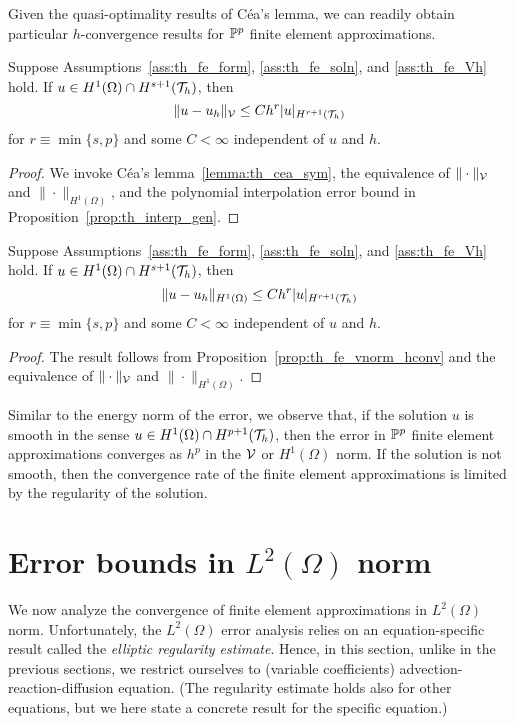 Given the quasi-optimality results of C\'ea's lemma, we can readily obtain particular $h$-convergence results for $\mathbb{P}^p$ finite element approximations.
\begin{proposition}
  \label{prop:th_fe_vnorm_hconv}
   Suppose Assumptions~\ref{ass:th_fe_form}, \ref{ass:th_fe_soln}, and \ref{ass:th_fe_Vh} hold. If $u \in H^1(\Omega) \cap H^{s+1}(\mathcal{T}_h)$, then
  \begin{equation}
    \| u - u_h \|_{\mathcal{V}} \leq C h^{r} | u |_{H^{r+1}(\mathcal{T}_h)}
  \end{equation}
  for $r \equiv \min\{ s,p \}$ and some $C < \infty$ independent of $u$ and $h$.
  \begin{proof}
    We invoke C\'ea's lemma~\ref{lemma:th_cea_sym}, the equivalence of $\| \cdot \|_{\mathcal{V}}$ and $\| \cdot \|_{H^1(\Omega)}$, and the polynomial interpolation error bound in Proposition~\ref{prop:th_interp_gen}.
  \end{proof}
\end{proposition}
\begin{proposition}
  Suppose Assumptions~\ref{ass:th_fe_form}, \ref{ass:th_fe_soln}, and \ref{ass:th_fe_Vh} hold. If $u \in H^1(\Omega) \cap H^{s+1}(\mathcal{T}_h)$, then
  \begin{equation}
    \| u - u_h \|_{H^1(\Omega)} \leq C h^{r} | u |_{H^{r+1}(\mathcal{T}_h)}
  \end{equation}
  for $r \equiv \min\{ s,p \}$ and some $C < \infty$ independent of $u$ and $h$.
  \begin{proof}
    The result follows from Proposition~\ref{prop:th_fe_vnorm_hconv} and the equivalence of $\| \cdot \|_{\mathcal{V}}$ and $\| \cdot \|_{H^1(\Omega)}$.
  \end{proof}
\end{proposition}

Similar to the energy norm of the error, we observe that, if the solution $u$ is smooth in the sense $u \in H^1(\Omega) \cap H^{p+1}(\mathcal{T}_h)$, then the error in $\mathbb{P}^p$ finite element approximations converges as $h^p$ in the $\mathcal{V}$ or $H^1(\Omega)$ norm.  If the solution is not smooth, then the convergence rate of the finite element approximations is limited by the regularity of the solution. 


\section{Error bounds in $L^2(\Omega)$ norm}
We now analyze the convergence of finite element approximations in $L^2(\Omega)$ norm.  Unfortunately, the $L^2(\Omega)$ error analysis relies on an equation-specific result called the \emph{elliptic regularity estimate}.  Hence, in this section, unlike in the previous sections, we restrict ourselves to (variable coefficients) advection-reaction-diffusion equation.  (The regularity estimate holds also for other equations, but we here state a concrete result for the specific equation.)

